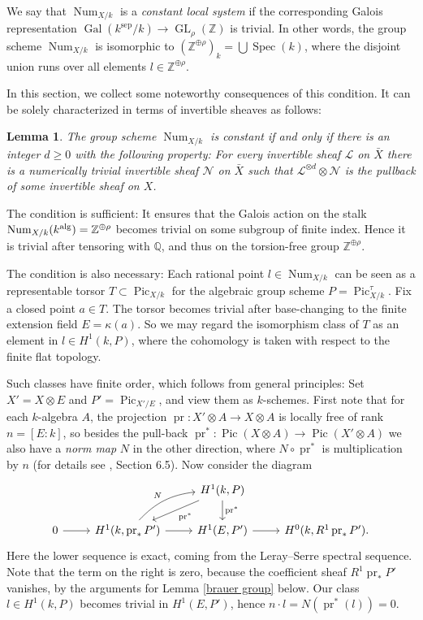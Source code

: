\documentclass[oneside, 12pt]{amsart}
\newcommand\mylabel[1]{\label{#1}\marginpar{\vspace{-1ex}\medskip\medskip\footnotesize \tt #1}}
\renewcommand\mylabel[1]{\label{#1}}
\newtheorem{lemma}[theorem]{Lemma}
\theoremstyle{definition}
\theoremstyle{remark}
\newcommand{\ZZ}{\mathbb{Z}}
\newcommand{\QQ}{\mathbb{Q}}
\newcommand{\shN}{\mathscr{N}}
\newcommand{\shL}{\mathscr{L}}
\newcommand{\alg}{\text{\rm alg}}
\newcommand{\Gal}{\operatorname{Gal}}
\newcommand{\GL}{\operatorname{GL}}
\newcommand{\Num}{\operatorname{Num}}
\newcommand{\Pic}{\operatorname{Pic}}
\newcommand{\pr}{\operatorname{pr}}
\newcommand{\ra}{\rightarrow}
\newcommand{\sep}{{\operatorname{sep}}}
\newcommand{\Spec}{\operatorname{Spec}}
\newcommand{\bX}{{\bar{X}}}
\begin{document}
We say that   $\Num_{X/k}$  is a  \emph{constant local system} if the corresponding Galois representation $\Gal(k^\sep/k)\ra\GL_\rho(\ZZ)$
is trivial. In other words, the group scheme  $\Num_{X/k}$  is isomorphic to  
$(\ZZ^{\oplus\rho})_k=\bigcup\Spec(k)$, where the disjoint union runs over all elements $l\in\ZZ^{\oplus\rho}$. 

In this section, we collect some noteworthy consequences of this condition. It can be solely characterized in terms
of invertible sheaves as follows:

\begin{lemma}
\mylabel{invertible sheaves}
The group scheme $\Num_{X/k}$ is constant if and only if there is an integer $d\geq 0$ with the following property:
For every invertible sheaf $\shL$ on $\bX$  there is a numerically trivial invertible sheaf $\shN$  on $\bX$
such that $\shL^{\otimes d}\otimes\shN$ is the pullback of some invertible sheaf on $X$.
\end{lemma}
 
\proof
The condition is sufficient: It ensures that the Galois action on the stalk  $\Num_{X/k}(k^\alg) =\ZZ^{\oplus\rho}$ becomes
trivial on some subgroup of finite index. Hence it is trivial after tensoring with $\QQ$, and thus
on the torsion-free group $\ZZ^{\oplus\rho}$.

The condition is also necessary:
Each rational point $l\in \Num_{X/k}$ can be seen as a representable  torsor
$T\subset\Pic_{X/k}$ for the algebraic group scheme $P=\Pic^\tau_{X/k}$.
Fix a closed point $a\in T$. The torsor becomes trivial after base-changing to the finite extension field $E=\kappa(a)$.
So we may regard the isomorphism class of $T$ as an element in $l\in H^1(k,P)$, where    the cohomology is taken
with respect to the finite flat topology. 

Such classes have  finite order, which follows from general principles:
Set $X'=X\otimes E$ and $P'=\Pic_{X'/E}$, and view them as $k$-schemes. First note that for each $k$-algebra $A$,
the projection $\pr:X'\otimes A\ra X\otimes A$ is locally free of rank $n=[E:k]$,
so  besides the pull-back   $\pr^*:\Pic(X\otimes A)\ra\Pic(X'\otimes A)$ we also have a \emph{norm map} $N$ in the other direction,
where $N\circ\pr^*$ is multiplication by $n$ (for details see \cite{EGA II}, Section 6.5).
Now consider the    diagram 
$$
\begin{tikzcd} 
 	& 			& H^1(k,P)\ar[d,"\pr^*"]\ar[dl,"\pr^*"]\\
0\ar[r]	& H^1(k,\pr_*P')\ar[r]\ar[ur,bend left=20,"N"]	& H^1(E,P')\ar[r]		& H^0(k,R^1\pr_*P').
\end{tikzcd}
$$
Here the lower   sequence is exact, coming  from the Leray--Serre spectral sequence.
Note that the term on the right is zero, because  the coefficient sheaf 
$R^1\pr_*P'$  vanishes, by the arguments for Lemma \ref{brauer group} below. 
Our class $l\in H^1(k,P)$ becomes trivial
in $H^1(E,P')$, hence $n \cdot l=N(\pr^*(l))=0$.
 
\end{document}
